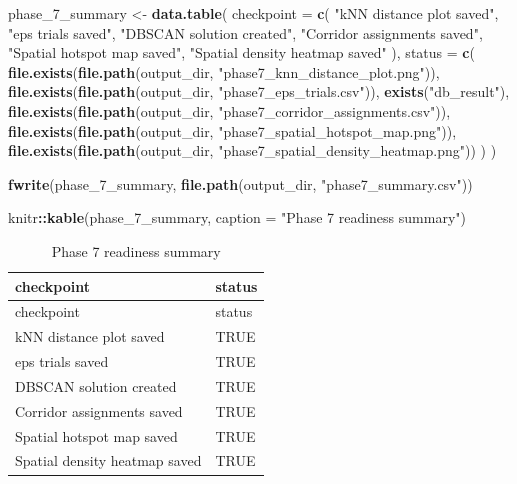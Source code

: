 \documentclass[
]{article}
\newenvironment{Shaded}{\begin{snugshade}}{\end{snugshade}}
\newcommand{\AttributeTok}[1]{\textcolor[rgb]{0.13,0.29,0.53}{#1}}
\newcommand{\FunctionTok}[1]{\textcolor[rgb]{0.13,0.29,0.53}{\textbf{#1}}}
\newcommand{\NormalTok}[1]{#1}
\newcommand{\OtherTok}[1]{\textcolor[rgb]{0.56,0.35,0.01}{#1}}
\newcommand{\SpecialCharTok}[1]{\textcolor[rgb]{0.81,0.36,0.00}{\textbf{#1}}}
\newcommand{\StringTok}[1]{\textcolor[rgb]{0.31,0.60,0.02}{#1}}
\begin{document}
\begin{Shaded}
\begin{Highlighting}[]
\NormalTok{phase\_7\_summary }\OtherTok{\textless{}{-}} \FunctionTok{data.table}\NormalTok{(}
  \AttributeTok{checkpoint =} \FunctionTok{c}\NormalTok{(}
    \StringTok{"kNN distance plot saved"}\NormalTok{,}
    \StringTok{"eps trials saved"}\NormalTok{,}
    \StringTok{"DBSCAN solution created"}\NormalTok{,}
    \StringTok{"Corridor assignments saved"}\NormalTok{,}
    \StringTok{"Spatial hotspot map saved"}\NormalTok{,}
    \StringTok{"Spatial density heatmap saved"}
\NormalTok{  ),}
  \AttributeTok{status =} \FunctionTok{c}\NormalTok{(}
    \FunctionTok{file.exists}\NormalTok{(}\FunctionTok{file.path}\NormalTok{(output\_dir, }\StringTok{"phase7\_knn\_distance\_plot.png"}\NormalTok{)),}
    \FunctionTok{file.exists}\NormalTok{(}\FunctionTok{file.path}\NormalTok{(output\_dir, }\StringTok{"phase7\_eps\_trials.csv"}\NormalTok{)),}
    \FunctionTok{exists}\NormalTok{(}\StringTok{"db\_result"}\NormalTok{),}
    \FunctionTok{file.exists}\NormalTok{(}\FunctionTok{file.path}\NormalTok{(output\_dir, }\StringTok{"phase7\_corridor\_assignments.csv"}\NormalTok{)),}
    \FunctionTok{file.exists}\NormalTok{(}\FunctionTok{file.path}\NormalTok{(output\_dir, }\StringTok{"phase7\_spatial\_hotspot\_map.png"}\NormalTok{)),}
    \FunctionTok{file.exists}\NormalTok{(}\FunctionTok{file.path}\NormalTok{(output\_dir, }\StringTok{"phase7\_spatial\_density\_heatmap.png"}\NormalTok{))}
\NormalTok{  )}
\NormalTok{)}

\FunctionTok{fwrite}\NormalTok{(phase\_7\_summary, }\FunctionTok{file.path}\NormalTok{(output\_dir, }\StringTok{"phase7\_summary.csv"}\NormalTok{))}

\NormalTok{knitr}\SpecialCharTok{::}\FunctionTok{kable}\NormalTok{(phase\_7\_summary, }\AttributeTok{caption =} \StringTok{"Phase 7 readiness summary"}\NormalTok{)}
\end{Highlighting}
\end{Shaded}

\begin{longtable}[]{@{}ll@{}}
\caption{Phase 7 readiness summary}\tabularnewline
\toprule\noalign{}
checkpoint & status \\
\midrule\noalign{}
\endfirsthead
\toprule\noalign{}
checkpoint & status \\
\midrule\noalign{}
\endhead
\bottomrule\noalign{}
\endlastfoot
kNN distance plot saved & TRUE \\
eps trials saved & TRUE \\
DBSCAN solution created & TRUE \\
Corridor assignments saved & TRUE \\
Spatial hotspot map saved & TRUE \\
Spatial density heatmap saved & TRUE \\
\end{longtable}
\end{document}
